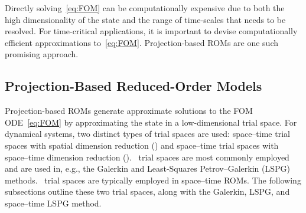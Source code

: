 \documentclass[3p,computermodern,10pt]{elsarticle}
\begin{document}
Directly solving~\eqref{eq:FOM} can be computationally expensive due to both the high dimensionality of the state and the range of time-scales that needs to be resolved. For time-critical applications, it is important to devise computationally efficient approximations to~\eqref{eq:FOM}. Projection-based ROMs are 
one such promising approach. 

\subsection{Projection-Based Reduced-Order Models}
Projection-based ROMs generate approximate solutions to the FOM ODE~\eqref{eq:FOM} by approximating the state in a low-dimensional trial space. For dynamical 
systems, two distinct types of trial spaces are used: space--time trial spaces with spatial dimension reduction (\spatialAcronym) and space--time trial spaces with space--time dimension reduction (\spaceTimeAcronym). \spatialAcronym\ trial spaces are most commonly employed and are used in, e.g., the Galerkin and Least-Squares Petrov--Galerkin (LSPG) methods. \spaceTimeAcronym\ trial spaces are typically 
employed in space--time ROMs. The following subsections outline these two trial spaces, along with the Galerkin, LSPG, and 
space--time LSPG method. 
\end{document}
